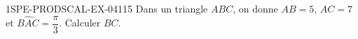 \begin{exercice}{1SPE-PRODSCAL-EX-041}{1}{5}
Dans un triangle $ABC$, on donne $AB = 5$, $AC = 7$ et $\widehat{BAC} = \dfrac{\pi}{3}$. Calculer $BC$.
\end{exercice}
